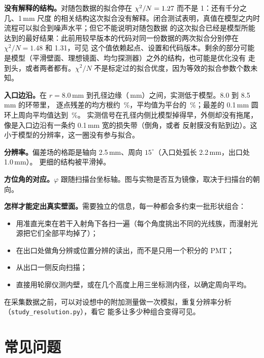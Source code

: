 \documentclass[11pt,a4paper,fontset=fandol]{ctexart}
\newcommand{\code}[1]{\texttt{#1}}
\begin{document}
\textbf{没有解释的结构。}对随包数据的拟合停在 $\chi^2/N=1.27$ 而不是 1：还有千分之几、1\,mm 尺度
的相关结构这次拟合没有解释。闭合测试表明，真值在模型之内时流程可以拟合到噪声水平；但它不能说明对随包数据
的这次拟合已经是模型所能达到的最好结果：此前用较早版本的代码对同一份数据的两次拟合分别停在 $\chi^2/N=1.48$ 和 1.31，可见
这个值依赖起点、设置和代码版本。剩余的部分可能是模型（平滑壁面、理想镜面、均匀探测器）之外的结构，也可能是优化没有
走到头，或者两者都有。$\chi^2/N$ 不是标定过的拟合优度，因为等效的拟合参数个数未知。

\textbf{入口边沿。}在 $r=8.0$\,mm 到孔径边缘（\RAp\,mm）之间，实测低于模型。8.0 到 8.5\,mm 的环带里，
逐点残差的均方根约 \RmsRing\,\%，平均值为平台的 \BiasRing\,\%；最差的 0.1\,mm 圆环上周向平均值达到
\RingWorst\,\%。
实测信号在孔径内侧比模型掉得早，外侧却没有拖尾，像是入口边沿有一条约 0.1\,mm 宽的损失带（倒角，或者
反射膜没有贴到边）。这小于模型的分辨率，这一圈没有参与拟合。

\textbf{分辨率。}偏差场的格距是轴向 2.5\,mm、周向 $15^\circ$（入口处弧长 2.2\,mm，出口处 1.0\,mm）。
更细的结构被平滑掉。

\textbf{方位角的对应。}$\varphi$ 跟随扫描台坐标轴。图与实物是否互为镜像，取决于扫描台的朝向。

\textbf{怎样才能定出真实壁面。}需要独立的信息，每一种都会多约束一批形状组合：
\begin{itemize}
\item 用准直光束在若干入射角下各扫一遍（每个角度挑出不同的光线族，而漫射光源把它们全部平均掉了）；
\item 在出口处做角分辨或位置分辨的读出，而不是只用一个积分的 PMT；
\item 从出口一侧反向扫描；
\item 直接用轮廓仪测内壁，或在几个高度上用三坐标测内径，以确定周向平均。
\end{itemize}
在采集数据之前，可以对设想中的附加测量做一次模拟，重复分辨率分析（\code{study\_resolution.py}），看它
能多让多少种组合变得可见。

\section{常见问题}
\end{document}
